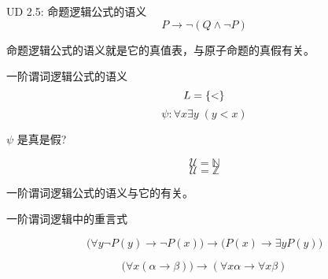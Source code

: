 
\begin{frame}{}
  \begin{exampleblock}{UD 2.5: 命题逻辑公式的语义}
    \[
      P \to \lnot (Q \land \lnot P)
    \]

    \vspace{0.40cm}
    \begin{center}
      {}
    \end{center}
  \end{exampleblock}

  \vspace{0.60cm}
  \begin{center}
    命题逻辑公式的语义就是它的真值表，与原子命题的真假有关。
  \end{center}
\end{frame}

\begin{frame}{}
  \begin{exampleblock}{一阶谓词逻辑公式的语义}
    \[
      L = \{<\}
    \]
    \[
      \psi: \forall x \exists y \; (y < x)
    \]

    \pause
    \begin{center}
      { $\psi$ 是真是假?}
    \end{center}
  \end{exampleblock}

  \pause
  \[
    \mathcal{U} = \mathbb{N}
  \]
  \pause
  \[
    \mathcal{U} = \mathbb{Z}
  \]

  \pause
  \begin{center}
    一阶谓词逻辑公式的语义与它的有关。
  \end{center}
\end{frame}

\begin{frame}{}
  \begin{center}
    一阶谓词逻辑中的重言式
  \end{center}

  \[
    \Big(\forall y \lnot P(y) \to \lnot P(x)\Big) \to \Big(P(x) \to \exists y P(y)\Big)
  \]

  \[
    \Big(\forall x (\alpha \to \beta)\Big) \to (\forall x \alpha \to \forall x \beta)
  \]
\end{frame}
